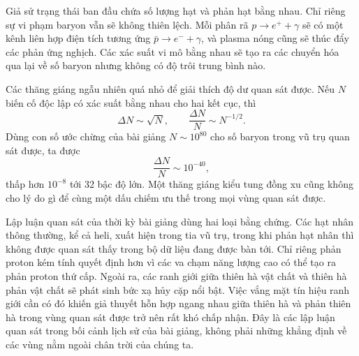 Giả sử trạng thái ban đầu chứa số lượng hạt và phản hạt bằng nhau. Chỉ riêng sự vi phạm baryon vẫn sẽ không thiên lệch. Mỗi phân rã \(p\to e^++\gamma\) sẽ có một kênh liên hợp điện tích tương ứng \(\bar p\to e^-+\gamma\), và plasma nóng cũng sẽ thúc đẩy các phản ứng nghịch. Các xác suất vi mô bằng nhau sẽ tạo ra các chuyển hóa qua lại về số baryon nhưng không có độ trôi trung bình nào.

\begin{classroomqa}
\end{classroomqa}

Các thăng giáng ngẫu nhiên quá nhỏ để giải thích độ dư quan sát được. Nếu \(N\) biến cố độc lập có xác suất bằng nhau cho hai kết cục, thì
\begin{equation}
\Delta N\sim\sqrt N,
\qquad
\frac{\Delta N}{N}\sim N^{-1/2}.
\end{equation}
Dùng con số ước chừng của bài giảng \(N\sim10^{80}\) cho số baryon trong vũ trụ quan sát được, ta được
\begin{equation}
\frac{\Delta N}{N}\sim10^{-40},
\end{equation}
thấp hơn \(10^{-8}\) tới 32 bậc độ lớn. Một thăng giáng kiểu tung đồng xu cũng không cho lý do gì để cùng một dấu chiếm ưu thế trong mọi vùng quan sát được.

\begin{classroomqa}
\end{classroomqa}

Lập luận quan sát của thời kỳ bài giảng dùng hai loại bằng chứng. Các hạt nhân thông thường, kể cả heli, xuất hiện trong tia vũ trụ, trong khi phản hạt nhân thì không được quan sát thấy trong bộ dữ liệu đang được bàn tới. Chỉ riêng phản proton kém tính quyết định hơn vì các va chạm năng lượng cao có thể tạo ra phản proton thứ cấp. Ngoài ra, các ranh giới giữa thiên hà vật chất và thiên hà phản vật chất sẽ phát sinh bức xạ hủy cặp nổi bật. Việc vắng mặt tín hiệu ranh giới cần có đó khiến giả thuyết hỗn hợp ngang nhau giữa thiên hà và phản thiên hà trong vùng quan sát được trở nên rất khó chấp nhận. Đây là các lập luận quan sát trong bối cảnh lịch sử của bài giảng, không phải những khẳng định về các vùng nằm ngoài chân trời của chúng ta.

